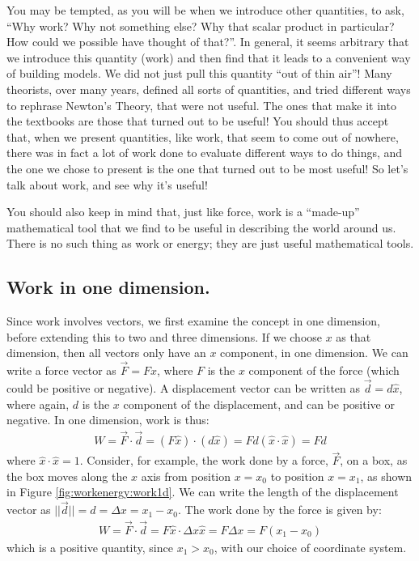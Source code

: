 You may be tempted, as you will be when we introduce other quantities, to ask, ``Why work? Why not something else? Why that scalar product in particular? How could we possible have thought of that?''. In general, it seems arbitrary that we introduce this quantity (work) and then find that it leads to a convenient way of building models. We did not just pull this quantity ``out of thin air''! Many theorists, over many years, defined all sorts of quantities, and tried different ways to rephrase Newton's Theory, that were not useful. The ones that make it into the textbooks are those that turned out to be useful! You should thus accept that, when we present quantities, like work, that seem to come out of nowhere, there was in fact a lot of work done to evaluate different ways to do things, and the one we chose to present is the one that turned out to be most useful! So let's talk about work, and see why it's useful!


You should also keep in mind that, just like force, work is a ``made-up'' mathematical tool that we find to be useful in describing the world around us. There is no such thing as work or energy; they are just useful mathematical tools.

\subsection{Work in one dimension.}
Since work involves vectors, we first examine the concept in one dimension, before extending this to two and three dimensions. If we choose $x$ as that dimension, then all vectors only have an $x$ component, in one dimension. We can write a force vector as $\vec F=F\hat x$, where $F$ is the $x$ component of the force (which could be positive or negative). A displacement vector can be written as $\vec d = d \hat x$, where again, $d$ is the $x$ component of the displacement, and can be positive or negative. In one dimension, work is thus:
\begin{align*}
W = \vec F \cdot \vec d = (F\hat x) \cdot ( d\hat x ) = Fd (\hat x\cdot\hat x)=Fd
\end{align*}
where $\hat x \cdot \hat x = 1$. Consider, for example, the work done by a force, $\vec F$, on a box, as the box moves along the $x$ axis from position $x=x_0$ to position $x=x_1$, as shown in Figure \ref{fig:workenergy:work1d}.
We can write the length of the displacement vector as $||\vec d|| =d= \Delta x = x_1-x_0$. The work done by the force is given by:
\begin{align*}
W = \vec F \cdot \vec d = F\hat x\cdot \Delta x\hat x =F\Delta x =F(x_1-x_0) 
\end{align*}
which is a positive quantity, since $x_1 > x_0$, with our choice of coordinate system. 

